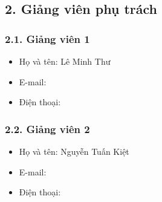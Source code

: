 \subsection*{2. Giảng viên phụ trách}
\subsubsection*{2.1. Giảng viên 1}
\begin{itemize}
    \item Họ và tên: Lê Minh Thư
    \item E-mail: 
    \item Điện thoại: 
\end{itemize}

\subsubsection*{2.2. Giảng viên 2}
\begin{itemize}
    \item Họ và tên: Nguyễn Tuấn Kiệt
    \item E-mail: 
    \item Điện thoại:
\end{itemize}
